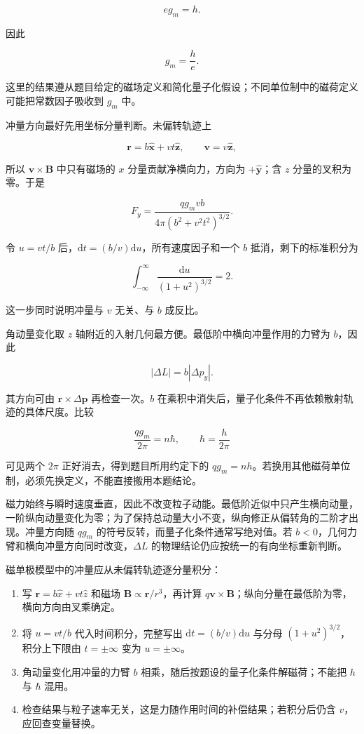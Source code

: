 \documentclass[12pt,a4paper,UTF8]{ctexart}
\newcommand{\tightlist}{\setlength{\itemsep}{0pt}\setlength{\parskip}{0pt}}
\begin{document}
\[eg_m=h.\]

因此

\[\boxed{g_m=\frac{h}{e}}. \tag{9}\]

这里的结果遵从题目给定的磁场定义和简化量子化假设；不同单位制中的磁荷定义可能把常数因子吸收到
\(g_m\) 中。

冲量方向最好先用坐标分量判断。未偏转轨迹上

\[\boldsymbol r=b\hat{\boldsymbol x}+vt\hat{\boldsymbol z},\qquad
\boldsymbol v=v\hat{\boldsymbol z},\]

所以 \(\boldsymbol v\times\boldsymbol B\) 中只有磁场的 \(x\)
分量贡献净横向力，方向为 \(+\hat{\boldsymbol y}\)；含 \(z\)
分量的叉积为零。于是

\[F_y=\frac{qg_mvb}{4\pi(b^2+v^2t^2)^{3/2}}.\]

令 \(u=vt/b\) 后，\(\mathrm dt=(b/v)\mathrm du\)，所有速度因子和一个
\(b\) 抵消，剩下的标准积分为

\[\int_{-\infty}^{\infty}\frac{\mathrm du}{(1+u^2)^{3/2}}=2.\]

这一步同时说明冲量与 \(v\) 无关、与 \(b\) 成反比。

角动量变化取 \(z\) 轴附近的入射几何最方便。最低阶中横向冲量作用的力臂为
\(b\)，因此

\[|\Delta L|=b|\Delta p_y|.\]

其方向可由 \(\boldsymbol r\times\Delta\boldsymbol p\) 再检查一次。\(b\)
在乘积中消失后，量子化条件不再依赖散射轨迹的具体尺度。比较

\[\frac{qg_m}{2\pi}=n\hbar,\qquad \hbar=\frac{h}{2\pi}\]

可见两个 \(2\pi\) 正好消去，得到题目所用约定下的
\(qg_m=nh\)。若换用其他磁荷单位制，必须先换定义，不能直接搬用本题结论。

磁力始终与瞬时速度垂直，因此不改变粒子动能。最低阶近似中只产生横向动量，一阶纵向动量变化为零；为了保持总动量大小不变，纵向修正从偏转角的二阶才出现。冲量方向随
\(qg_m\) 的符号反转，而量子化条件通常写绝对值。若
\(b<0\)，几何力臂和横向冲量方向同时改变，\(\Delta L\)
的物理结论仍应按统一的有向坐标重新判断。

磁单极模型中的冲量应从未偏转轨迹逐分量积分：

\begin{enumerate}
\def\labelenumi{\arabic{enumi}.}
\tightlist
\item
  写 \(\boldsymbol r=b\hat x+vt\hat z\) 和磁场
  \(\boldsymbol B\propto\boldsymbol r/r^3\)，再计算
  \(q\boldsymbol v\times\boldsymbol B\)；纵向分量在最低阶为零，横向方向由叉乘确定。
\item
  将 \(u=vt/b\) 代入时间积分，完整写出 \(\mathrm dt=(b/v)\mathrm du\)
  与分母 \((1+u^2)^{3/2}\)，积分上下限由 \(t=\pm\infty\) 变为
  \(u=\pm\infty\)。
\item
  角动量变化用冲量的力臂 \(b\)
  相乘，随后按题设的量子化条件解磁荷；不能把 \(h\) 与 \(\hbar\) 混用。
\item
  检查结果与粒子速率无关，这是力随作用时间的补偿结果；若积分后仍含
  \(v\)，应回查变量替换。
\end{enumerate}
\end{document}
